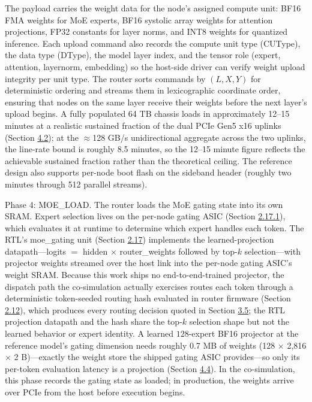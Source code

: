 \documentclass[10pt,twocolumn]{article}
\begin{document}
The payload carries the weight data for the node's assigned compute unit: BF16 FMA weights for MoE experts, BF16 systolic array weights for attention projections, FP32 constants for layer norms, and INT8 weights for quantized inference. Each upload command also records the compute unit type (CUType), the data type (DType), the model layer index, and the tensor role (expert, attention, layernorm, embedding) so the host-side driver can verify weight upload integrity per unit type. The router sorts commands by $(L, X, Y)$ for deterministic ordering and streams them in lexicographic coordinate order, ensuring that nodes on the same layer receive their weights before the next layer's upload begins. A fully populated 64 TB chassis loads in approximately 12--15 minutes at a realistic sustained fraction of the dual PCIe Gen5 x16 uplinks (Section \hyperref[sec:4.2]{4.2}); at the $\approx$128 GB/s unidirectional aggregate across the two uplinks, the line-rate bound is roughly 8.5 minutes, so the 12--15 minute figure reflects the achievable sustained fraction rather than the theoretical ceiling. The reference design also supports per-node boot flash on the sideband header (roughly two minutes through 512 parallel streams).

Phase 4: MOE\_LOAD. The router loads the MoE gating state into its own SRAM. Expert selection lives on the per-node gating ASIC (Section \hyperref[sec:2.17.1]{2.17.1}), which evaluates it at runtime to determine which expert handles each token. The RTL's moe\_gating unit (Section \hyperref[sec:2.17]{2.17}) implements the learned-projection datapath---logits $=$ hidden $\times$ router\_weights followed by top-$k$ selection---with projector weights streamed over the host link into the per-node gating ASIC's weight SRAM. Because this work ships no end-to-end-trained projector, the dispatch path the co-simulation actually exercises routes each token through a deterministic token-seeded routing hash evaluated in router firmware (Section \hyperref[sec:2.12]{2.12}), which produces every routing decision quoted in Section \hyperref[sec:3.5]{3.5}; the RTL projection datapath and the hash share the top-$k$ selection shape but not the learned behavior or expert identity. A learned $128$-expert BF16 projector at the reference model's gating dimension needs roughly 0.7 MB of weights (128 $\times$ 2,816 $\times$ 2 B)---exactly the weight store the shipped gating ASIC provides---so only its per-token evaluation latency is a projection (Section \hyperref[sec:4.4]{4.4}). In the co-simulation, this phase records the gating state as loaded; in production, the weights arrive over PCIe from the host before execution begins.
\end{document}
